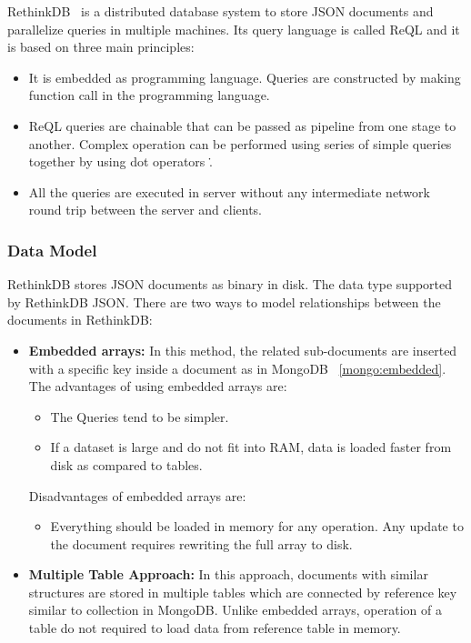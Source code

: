 RethinkDB~\citep{rethinkdb} is a distributed database system to store  JSON documents and parallelize queries in multiple machines. Its query language is called ReQL and it is based on three main principles:
 \begin{itemize}
 \item  It is  embedded  as programming language. Queries are constructed by making function call in the programming language. 
 \item ReQL queries are chainable that can be passed as pipeline from one stage to another. Complex operation can be performed using series of simple queries together by using dot operators \. . 
 \item All the queries are executed in server without any intermediate network round trip between the server and clients.
 \end{itemize}
  
\subsubsection{Data Model}
RethinkDB stores JSON documents as binary in disk. The data type supported by RethinkDB JSON. 
There are two ways to model relationships between the documents in RethinkDB: 
\begin{itemize}
	\item \textbf{Embedded arrays:} In this method, the related sub-documents are inserted with a specific key inside a document as in MongoDB ~\ref{mongo:embedded}. The advantages of using embedded arrays are:
		\begin{itemize}
			\item The Queries tend to be simpler. 
			\item If a dataset is large and do not fit into RAM, data is loaded faster from disk as compared to tables. 
		\end{itemize}
		Disadvantages of embedded arrays are: 
		\begin{itemize}
			\item Everything should be loaded in memory for any operation. Any update to the document requires rewriting the full array to disk.
		\end{itemize}
		
	\item 
	\textbf{Multiple Table Approach:} In this approach, documents with similar structures are stored in multiple tables which are connected by reference key similar to collection in MongoDB. Unlike embedded arrays, operation of a table do not required to load data from reference table in memory.
\end{itemize}

